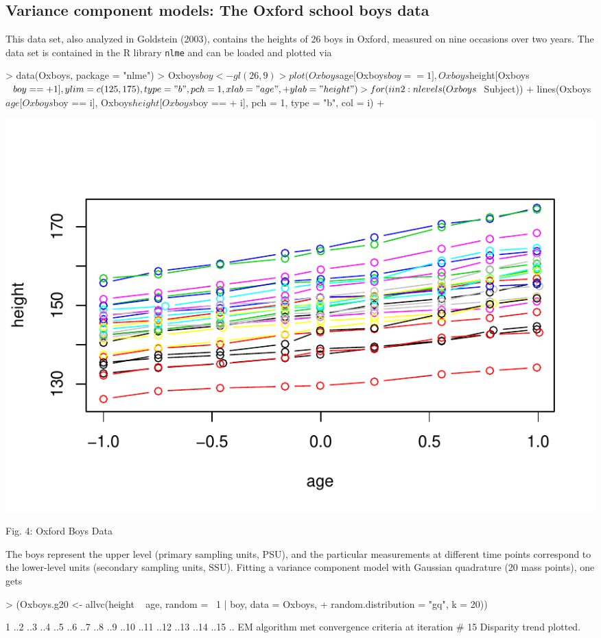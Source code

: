 \documentclass[a4paper]{article}
\begin{document}
\begin{landscape}
 
  
 
 

 

 \subsection{Variance component models: The Oxford school boys data}
 
 This data set, also analyzed in Goldstein (2003), contains the heights of 26 boys in Oxford, measured on
 nine occasions over two years. The data set is contained in the R library {\tt nlme} and can 
 be loaded and plotted via
 
 \begin{minipage}{21cm}
\begin{Schunk}
\begin{Sinput}
> data(Oxboys, package = "nlme")
> Oxboys$boy <- gl(26, 9)
> plot(Oxboys$age[Oxboys$boy == 1], Oxboys$height[Oxboys$boy == 
+     1], ylim = c(125, 175), type = "b", pch = 1, xlab = "age", 
+     ylab = "height")
> for (i in 2:nlevels(Oxboys$Subject)) {
+     lines(Oxboys$age[Oxboys$boy == i], Oxboys$height[Oxboys$boy == 
+         i], pch = 1, type = "b", col = i)
+ }
\end{Sinput}
\end{Schunk}
\includegraphics{npmlreg-v-035}
 
 Fig. 4:  Oxford Boys Data %
\end{minipage}

 The boys represent the upper level 
 (primary sampling units, PSU), and the particular measurements at different time points 
 correspond to the lower-level units 
 (secondary sampling units, SSU).   Fitting a variance component model with Gaussian quadrature
  (20 mass points), one gets
\begin{Schunk}
\begin{Sinput}
> (Oxboys.g20 <- allvc(height ~ age, random = ~1 | boy, data = Oxboys, 
+     random.distribution = "gq", k = 20))
\end{Sinput}
\begin{Soutput}
1 ..2 ..3 ..4 ..5 ..6 ..7 ..8 ..9 ..10 ..11 ..12 ..13 ..14 ..15 ..
EM algorithm met convergence criteria at iteration #  15 
Disparity trend plotted.


\end{Soutput}
\end{Schunk}
\end{landscape}
\end{document}
